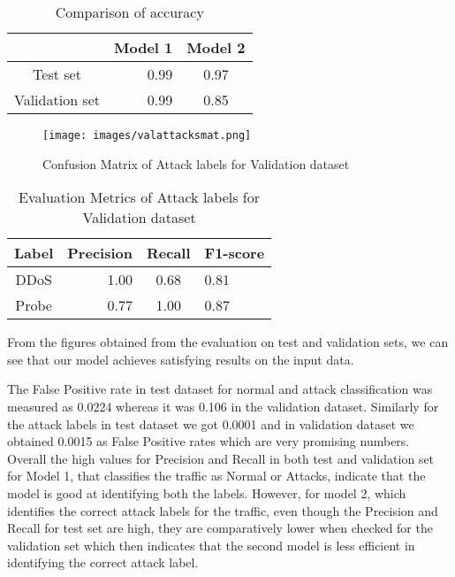 \begin{table}[tbh]
	\centering
	\caption{Comparison of accuracy}
	\begin{tabular}{|c|r|c|} %
		\hline %
		&Model 1 &Model 2 \\
		\hline %
		Test set &0.99 &0.97 \\
		\hline %
		Validation set &0.99 &0.85 \\
		\hline
	\end{tabular}
	\label{Accuracy comparison}
\end{table}
\begin{figure}[H] %
	\begin{center}
		\texttt{[image: images/valattacksmat.png]} 
		\caption{Confusion Matrix of Attack labels for Validation dataset} %
		\label{Confusion Matrix of Attack labels for Validation dataset} 
	\end{center}
\end{figure}
\begin{table}[tbh]
	\centering
	\caption{Evaluation Metrics of Attack labels for Validation dataset}
	\begin{tabular}{|c|r|c|l|} %
		\hline %
		Label  &Precision &Recall &F1-score\\
		\hline %
		DDoS &1.00 &0.68 &0.81\\
		\hline %
		Probe &0.77 &1.00 &0.87\\
		\hline
	\end{tabular}
	\label{Evaluation Metrics of Attack labels for validation dataset}
\end{table}
From the figures obtained from the evaluation on test and validation sets, we can see that our model achieves satisfying results on the input data.\par
The False Positive rate in test dataset for normal and attack classification was measured as 0.0224 whereas it was 0.106 in the validation dataset. Similarly for the attack labels in test dataset we got 0.0001 and in validation dataset we obtained 0.0015 as False Positive rates which are very promising numbers.\\
Overall the high values for Precision and Recall in both test and validation set for Model 1, that classifies the traffic as Normal or Attacks, indicate that the model is good at identifying both the labels. However, for model 2, which identifies the correct attack labels for the traffic, even though the Precision and Recall for test set are high, they are 
comparatively lower when checked for the validation set which then indicates that the second model is less efficient in identifying the correct attack label.
